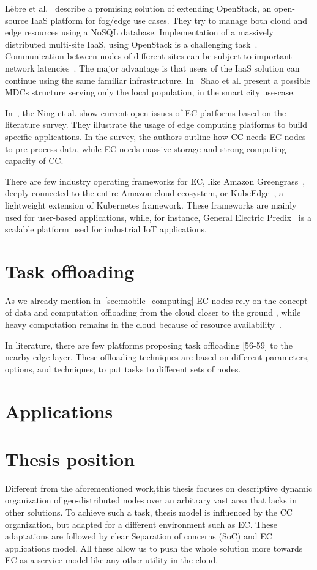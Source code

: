 L{\`{e}}bre et al.~\cite{LebrePSD17} describe a promising solution of extending OpenStack, an open-source IaaS platform for fog/edge use cases. They try to manage both cloud and edge resources using a NoSQL database. Implementation of a massively distributed multi-site IaaS, using OpenStack is a challenging task~\cite{LebrePSD17}. Communication between nodes of different sites can be subject to important network latencies~\cite{LebrePSD17}. The major advantage is that users of the IaaS solution can continue using the same familiar infrastructure. In~\cite{ShaoLFJL19} Shao et al. present a possible MDCs structure serving only the local population, in the smart city use-case.

In~\cite{NingLSY20}, the Ning et al. show current open issues of EC platforms based on the literature survey. They illustrate the usage of edge computing platforms to build specific applications. In the survey, the authors outline how CC needs EC nodes to pre-process data, while EC needs massive storage and strong computing capacity of CC.

There are few industry operating frameworks for EC, like Amazon Greengrass~\cite{kurniawan_2018}, deeply connected to the entire Amazon cloud ecosystem, or KubeEdge~\cite{KubeEdge}, a lightweight extension of Kubernetes framework. These frameworks are mainly used for user-based applications, while, for instance, General Electric Predix~\cite{GE_Predix} is a scalable platform used for industrial IoT applications.
%
%
\section{Task offloading}\label{sec:task_offloading}
%
As we already mention in~\ref{sec:mobile_computing} EC nodes rely on the concept of data and computation offloading from the cloud closer to the ground \cite{KhuneP19}, while heavy computation remains in the cloud because of resource availability~\cite{NingLSY20}.

In literature, there are few platforms proposing task offloading [56-59] to the nearby edge layer. These offloading techniques are based on different parameters, options, and techniques, to put tasks to different sets of nodes.
%
%

\section{Applications}\label{sec:applications}
%
%

\section{Thesis position}\label{sec:thesis_position}
Different from the aforementioned work,this thesis focuses on descriptive dynamic organization of geo-distributed nodes over an arbitrary vast area that lacks in other solutions. To achieve such a task, thesis model is influenced by the CC organization, but adapted for a different environment such as EC. These adaptations are followed by clear Separation of concerns (SoC) and EC applications model. All these allow us to push the whole solution more towards EC as a service model like any other utility in the cloud.
%
%